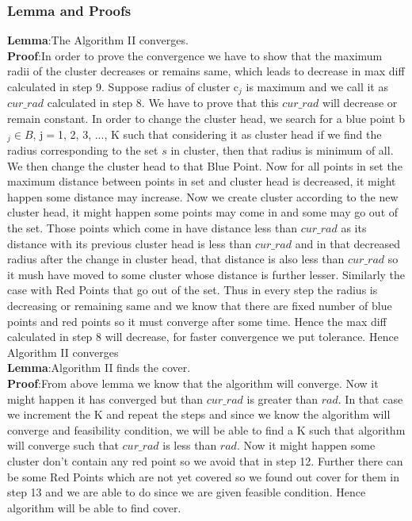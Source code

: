 \documentclass[12pt,a4wide]{report}
\theoremstyle{plain}
\theoremstyle{definition}
\theoremstyle{remark}
\begin{document}
\subsubsection{Lemma and Proofs}
\textbf{Lemma}:The Algorithm II converges.\\
\textbf{Proof}:In order to prove the convergence we have to show that the maximum radii of the cluster decreases or 
remains same, which leads to decrease in max diff calculated in step 9. Suppose radius of cluster c$_{j}$ is maximum 
and we call it as $cur\_ rad$ calculated in step 8. We have to prove that this $cur\_rad$ will decrease or remain constant.
In order to change the cluster head, we search for a blue point b$_{j} \in B$, j$=$1, 2, 3, ..., K such that considering it 
as cluster head if we find the radius corresponding to the set $s$ in cluster, then that radius is minimum of all. We 
then change the cluster head to that Blue Point. Now for all points in 
set the maximum distance between points in set and cluster head is decreased, it might happen some distance may increase. 
Now we create cluster according to the new cluster head, it might happen some points may come in and some may go out of 
the set. Those points which come in have distance less than $cur\_rad$ as its distance with its previous cluster head 
is less than $cur\_rad$ and in that decreased radius after the change in cluster head, that distance is also less than 
$cur\_rad$ so it mush have moved to some cluster whose distance is further lesser. Similarly the case with Red Points 
that go out of the set. Thus in every step the radius is decreasing or remaining same and 
we know that there are fixed number of blue points and red points so it must converge after some time. 
Hence the max diff calculated in step 8 will decrease, for faster convergence
we put tolerance. Hence Algorithm II converges\\
\textbf{Lemma}:Algorithm II finds the cover.\\
\textbf{Proof}:From above lemma we know that the algorithm will converge. Now it might happen it has converged but than 
$cur\_rad$ is greater than $rad$. In that case we increment the K and repeat the steps and since we know the algorithm will
converge and feasibility condition, we will be able to find a K such that algorithm will converge such that $cur\_rad$ is less 
than $rad$. Now it might happen some cluster don't contain any red point so we avoid that in step 12. Further there can be some
Red Points which are not yet covered so we found out cover for them in step 13 and we are able to do since we are given feasible
condition. Hence algorithm will be able to find cover.\\
\clearpage
\end{document}
